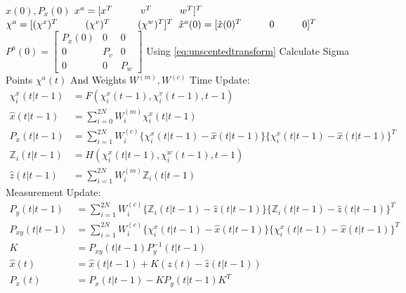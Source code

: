 \begin{appendices}
\begin{algorithmic}
\State {} $\hat{x}(0), P_{x}(0)$
\State {} $x^a = [x^T \hspace*{1cm} v^T \hspace*{1cm} w^T]^T$
\State {} $\chi^a = [(\chi^x)^T  \hspace*{1cm} (\chi^v)^T  \hspace*{1cm} (\chi^w)^T]^T$
\State {} $\hat{x}^a(0) = [\hat{x}(0)^T  \hspace*{1cm} 0  \hspace*{1cm} 0]^T$
\State {} $P^a(0) =
\begin{bmatrix}
	P_{x}(0) & 0 & 0\\
	0 & P_v & 0\\
	0 & 0 & P_w
\end{bmatrix}$ 
  \State Using \ref{eq:unscentedtransform} Calculate Sigma Points $\chi^a(t)$ And Weights $W^{(m)}, W^{(c)}$
  \State Time Update:
  \begin{align*}
  	\chi_i^x(t\vert t-1) &= F(\chi_i^x(t-1), \chi_i^v(t-1), t-1)\\
  	\hat{x}(t\vert t-1) &= \sum_{i=0}^{2N} W_i^{(m)}\chi_i^x(t\vert t-1)\\
  	P_{x}(t\vert t-1) &= \sum_{i=1}^{2N} W_i^{(c)} \{\chi_i^x(t\vert t-1) - \hat{x}(t\vert t-1)\}\{\chi_i^x(t\vert t-1) - \hat{x}(t\vert t-1)\}^T\\
  	\mathbb{Z}_i(t\vert t-1) &= H(\chi_i^x(t\vert t-1), \chi_i^w(t-1), t-1)\\
  	\hat{z}(t\vert t-1) &= \sum_{i=1}^{2N} W_i^{(m)}\mathbb{Z}_i(t\vert t-1)
  \end{align*}
  \State Measurement Update:
  \begin{align*}
  	P_{y}(t\vert t-1) &= \sum_{i=1}^{2N}W_i^{(c)}\{\mathbb{Z}_i(t\vert t-1) - \hat{z}(t\vert t-1)\}\{\mathbb{Z}_i(t\vert t-1) - \hat{z}(t\vert t-1)\}^T\\
  	P_{xy}(t\vert t-1) &= \sum_{i=1}^{2N}W_i^{(c)}\{\chi_i^x(t\vert t-1) - \hat{x}(t\vert t-1)\}\{\chi_i^x(t\vert t-1) - \hat{x}(t\vert t-1)\}^T\\
  	K &= P_{xy}(t\vert t-1)P^{-1}_{y}(t\vert t-1)\\
  	\hat{x}(t) &= \hat{x}(t\vert t-1) + K(z(t) - \hat{z}(t\vert t-1))\\
  	P_{x}(t) &= P_{x}(t\vert t-1) - KP_{y}(t\vert t-1)K^T
  \end{align*}
\End
\end{algorithmic}


\end{appendices}
